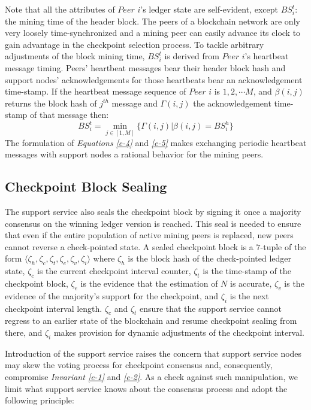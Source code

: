 Note that all the attributes of $Peer$ $i$'s ledger state are self-evident, except $BS_i^t$: the mining time of the header block. The peers of a blockchain network are only very loosely time-synchronized \cite{Turek:1992:MFC:136541.136542} and a mining peer can easily advance its clock to gain advantage in the checkpoint selection process. To tackle arbitrary adjustments of the block mining time, $BS_i^t$ is derived from $Peer$ $i$'s heartbeat message timing. Peers' heartbeat messages bear their header block hash and support nodes' acknowledgements for those heartbeats bear an acknowledgement time-stamp. If the heartbeat message sequence of $Peer$ $i$ is $1, 2, \cdots M$, and $\beta(i,j)$ returns the block hash of $j^{th}$ message and $\Gamma(i, j)$ the acknowledgement time-stamp of that message then:
\begin{equation}
\label{e-5}
BS_i^t = \min_{j \in \left[ 1, M \right]}\{\Gamma(i, j) | \beta(i,j) = BS_i^h \}
\end{equation}
The formulation of \textit{Equations \ref{e-4}} and \textit{\ref{e-5}} makes exchanging periodic heartbeat messages with support nodes a rational behavior for the mining peers.

\subsection{Checkpoint Block Sealing}
The support service also seals the checkpoint block by signing it once a majority consensus on the winning ledger version is reached. This seal is needed to ensure that even if the entire population of active mining peers is replaced, new peers cannot reverse a check-pointed state. A sealed checkpoint block is a $7$-tuple of the form $\langle \zeta_h, \zeta_c, \zeta_t, \zeta_e, \zeta_v, \zeta_i \rangle$  where $\zeta_h$ is the block hash of the check-pointed ledger state, $\zeta_c$ is the current checkpoint interval counter, $\zeta_t$ is the time-stamp of the checkpoint block, $\zeta_e$ is the evidence that the estimation of $N$ is accurate, $\zeta_v$ is the evidence of the majority's support for the checkpoint, and $\zeta_i$ is the next checkpoint interval length. $\zeta_c$ and $\zeta_t$ ensure that the support service cannot regress to an earlier state of the blockchain and resume checkpoint sealing from there, and $\zeta_i$ makes provision for dynamic adjustments of the checkpoint interval.

Introduction of the support service raises the concern that support service nodes may skew the voting process for checkpoint consensus and, consequently, compromise \textit{Invariant \ref{e-1}} and \textit{\ref{e-2}}. As a check against such manipulation, we limit what support service knows about the consensus process and adopt the following principle:


